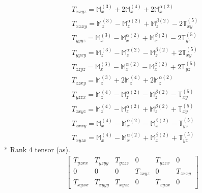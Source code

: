 \documentclass[fleqn,8pt,landscape]{jsarticle}
\begin{document}
\begin{align*}
& T_{xxyz} = \mathbb{M}_{x}^{(3)} + 2 \mathbb{M}_{x}^{(4)} + 2 \mathbb{M}_{x}^{\alpha(2)} \\
& T_{xxxy} = \mathbb{M}_{z}^{(3)} - \mathbb{M}_{z}^{\alpha(2)} + \mathbb{M}_{z}^{\beta(2)} - 2 \mathbb{T}_{xy}^{(5)} \\
& T_{yyyz} = \mathbb{M}_{x}^{(3)} - \mathbb{M}_{x}^{\alpha(2)} + \mathbb{M}_{x}^{\beta(2)} - 2 \mathbb{T}_{yz}^{(5)} \\
& T_{yyxy} = \mathbb{M}_{z}^{(3)} - \mathbb{M}_{z}^{\alpha(2)} - \mathbb{M}_{z}^{\beta(2)} + 2 \mathbb{T}_{xy}^{(5)} \\
& T_{zzyz} = \mathbb{M}_{x}^{(3)} - \mathbb{M}_{x}^{\alpha(2)} - \mathbb{M}_{x}^{\beta(2)} + 2 \mathbb{T}_{yz}^{(5)} \\
& T_{zzxy} = \mathbb{M}_{z}^{(3)} + 2 \mathbb{M}_{z}^{(4)} + 2 \mathbb{M}_{z}^{\alpha(2)} \\
& T_{yzzx} = \mathbb{M}_{z}^{(4)} - \mathbb{M}_{z}^{\alpha(2)} - \mathbb{M}_{z}^{\beta(2)} - \mathbb{T}_{xy}^{(5)} \\
& T_{zxyz} = \mathbb{M}_{z}^{(4)} - \mathbb{M}_{z}^{\alpha(2)} + \mathbb{M}_{z}^{\beta(2)} + \mathbb{T}_{xy}^{(5)} \\
& T_{zxxy} = \mathbb{M}_{x}^{(4)} - \mathbb{M}_{x}^{\alpha(2)} - \mathbb{M}_{x}^{\beta(2)} - \mathbb{T}_{yz}^{(5)} \\
& T_{xyzx} = \mathbb{M}_{x}^{(4)} - \mathbb{M}_{x}^{\alpha(2)} + \mathbb{M}_{x}^{\beta(2)} + \mathbb{T}_{yz}^{(5)}
\end{align*}
* Rank 4 tensor (as).
\begin{align*}
\begin{bmatrix} T_{yzxx} & T_{yzyy} & T_{yzzz} & 0 & T_{yzzx} & 0 \\ 0 & 0 & 0 & T_{zxyz} & 0 & T_{zxxy} \\ T_{xyxx} & T_{xyyy} & T_{xyzz} & 0 & T_{xyzx} & 0 \end{bmatrix}
\end{align*}
\end{document}
